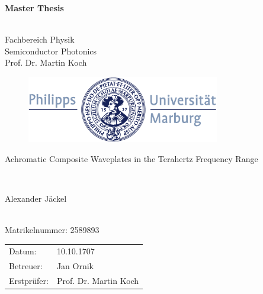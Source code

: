 \documentclass[12pt, a4paper]{report}
\begin{document}
\begin{titlepage}
  \vspace{3cm}
  \thispagestyle{empty}
  \begin{center}
    \begin{LARGE}
      \textbf{Master Thesis}
    \end{LARGE}\\
    Fachbereich Physik \\
    Semiconductor Photonics \\
    Prof. Dr. Martin Koch
    \\[1cm]
    \begin{figure}[h]
    \hspace{0.8cm}
      \centering
      \includegraphics[width=0.75\textwidth]{images/title_logo.pdf}
    \end{figure}
    \vspace{2cm}
    \begin{LARGE}
      Achromatic Composite Waveplates in the Terahertz Frequency Range
    \end{LARGE}\\[2cm]
    \begin{LARGE}
      Alexander Jäckel
    \end{LARGE}
    \\
    Matrikelnummer: 2589893
  \end{center}
  \vfill
    \noindent\begin{tabular}{ll}
      Datum: & 10.10.1707 \\
      Betreuer: & Jan Ornik \\
      Erstprüfer: & Prof. Dr. Martin Koch \\
    \end{tabular}
\end{titlepage}
\end{document}
